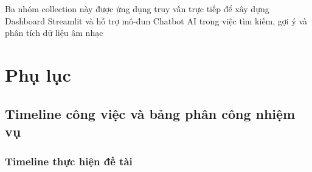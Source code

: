 \documentclass{../hcmut-report}
\begin{document}
\noindent
Ba nhóm collection này được ứng dụng truy vấn trực tiếp để xây dựng Dashboard Streamlit và hỗ trợ mô-đun Chatbot AI trong việc tìm kiếm, gợi ý và phân tích dữ liệu âm nhạc







\section{Phụ lục}

\subsection{Timeline công việc và bảng phân công nhiệm vụ}
\subsubsection{Timeline thực hiện đề tài}
\end{document}
